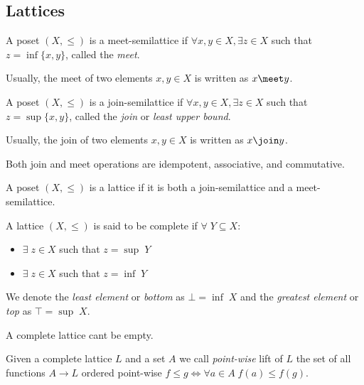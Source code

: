 \subsection{Lattices}

\begin{definition}
  A poset $(X, \leq)$ is a meet-semilattice if $\forall x, y \in X, \exists z 
  \in X$ such that $z = \inf \{x, y\}$, called the \textit{meet}.

  Usually, the meet of two elements $x, y \in X$ is written as $x \meet y$.
\end{definition}

\begin{definition}
  A poset $(X, \leq)$ is a join-semilattice if $\forall x, y \in X, \exists z 
  \in X$ such that $z = \sup \{x, y\}$, called the \textit{join} or 
  \textit{least upper bound}.

  Usually, the join of two elements $x, y \in X$ is written as $x \join y$.
\end{definition}

\begin{observation}
  Both join and meet operations are idempotent, associative, and commutative.
\end{observation}

\begin{definition}[Lattice]
  A poset $(X, \leq)$ is a lattice if it is both a join-semilattice and a 
  meet-semilattice.
\end{definition}

\begin{definition}
  A lattice $(X, \leq)$ is said to be complete if $\forall \; Y \subseteq X$:
  \begin{itemize}
    \item $\exists \; z \in X$ such that $z = \sup \; Y$
    \item $\exists \; z \in X$ such that $z = \inf \; Y$
  \end{itemize}

  We denote the \textit{least element} or \textit{bottom} as $\bot = \inf \; X$ 
  and the \textit{greatest element} or \textit{top} as $\top = \sup \; X$.
\end{definition}

\begin{observation}
  A complete lattice cant be empty.
\end{observation}

\begin{definition}
  Given a complete lattice $L$ and a set $A$ we call \textit{point-wise} lift
  of $L$ the set of all functions $A \to L$ ordered point-wise $f \leq g \iff
  \forall a \in A \; f(a) \leq f(g)$.
\end{definition}

